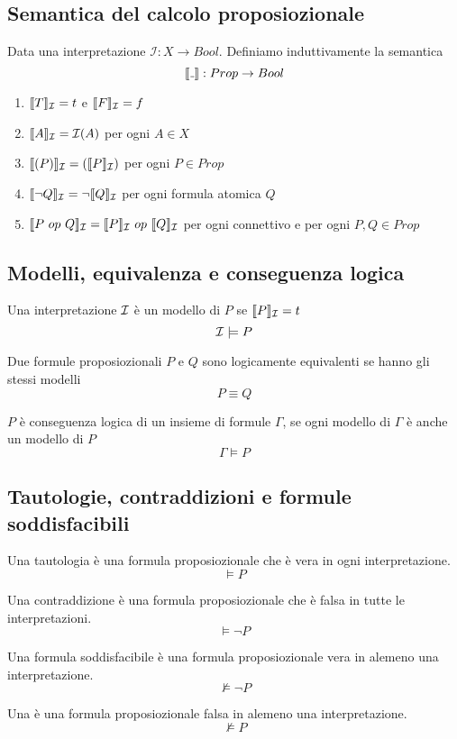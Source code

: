 \documentclass{article}
\begin{document}
\subsection*{Semantica del calcolo proposiozionale}
Data una interpretazione \(\mathcal{I}: X \rightarrow Bool\). Definiamo induttivamente la semantica
\[\llbracket\mathunderscore\rrbracket: Prop \rightarrow Bool\]
\begin{enumerate}
    \item \(\llbracket T \rrbracket_{\mathcal{I}} = t\) e \(\llbracket F \rrbracket_{\mathcal{I}} = f\)
    \item \(\llbracket A \rrbracket_{\mathcal{I}} = \mathcal{I}(A)\) per ogni \(A \in X\)
    \item \(\llbracket (P) \rrbracket_{\mathcal{I}} = (\llbracket P \rrbracket_{\mathcal{I}})\) per ogni \(P \in Prop\)
    \item \(\llbracket \lnot Q \rrbracket_{\mathcal{I}} = \lnot\llbracket Q \rrbracket_{\mathcal{I}}\) per ogni formula atomica \(Q\)
    \item \(\llbracket P\ op\ Q \rrbracket_{\mathcal{I}} = \llbracket P \rrbracket_{\mathcal{I}}\ op\ \llbracket Q \rrbracket_{\mathcal{I}}\) per ogni connettivo e per ogni \(P, Q \in Prop\)
\end{enumerate}
\subsection*{Modelli, equivalenza e conseguenza logica}
Una interpretazione \(\mathcal{I}\) è un modello di \(P\) se \(\llbracket P \rrbracket_{\mathcal{I}} = t\)
\[\mathcal{I} \models P\]

\noindent Due formule proposiozionali \(P\) e \(Q\) sono logicamente equivalenti se hanno gli stessi modelli
\[P \equiv Q\]

\noindent \(P\) è conseguenza logica di un insieme di formule \(\Gamma\), se ogni modello di \(\Gamma\) è anche un modello di \(P\)
\[\Gamma \models P\]
\subsection*{Tautologie, contraddizioni e formule soddisfacibili}
Una tautologia è una formula proposiozionale che è vera in ogni interpretazione.
\[\models P\]

\noindent Una contraddizione è una formula proposiozionale che è falsa in tutte le interpretazioni.
\[\models \lnot P\]

\noindent Una formula soddisfacibile è una formula proposiozionale vera in alemeno una interpretazione.
\[\not\models \lnot P\]

\noindent Una  è una formula proposiozionale falsa in alemeno una interpretazione.
\[\not\models P\]
\end{document}
